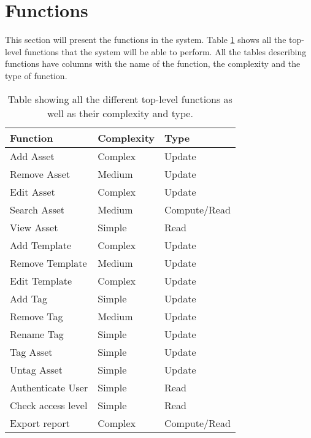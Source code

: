 \section{Functions}\label{sc:functions}

This section will present the functions in the system. Table \ref{tab:functions} shows all the top-level functions that the system will be able to perform. All the tables describing functions have columns with the name of the function, the complexity and the type of function.

\begin{table}[H]
\centering
    \begin{tabular}{|l|l|l|}
        \hline
        \textbf{Function} & \textbf{Complexity} & \textbf{Type} \\
        \hline
        \hline
        Add Asset & Complex & Update\\
        \hline
        Remove Asset & Medium & Update\\
        \hline
        Edit Asset & Complex & Update\\
        \hline
        Search Asset & Medium & Compute/Read\\
        \hline
        View Asset & Simple & Read\\
        \hline
        Add Template & Complex & Update\\
        \hline
        Remove Template & Medium & Update\\
        \hline
        Edit Template & Complex & Update\\
        \hline
        Add Tag & Simple & Update\\
        \hline
        Remove Tag & Medium & Update\\
        \hline
        Rename Tag & Simple & Update\\
        \hline
        Tag Asset & Simple & Update\\
        \hline
        Untag Asset & Simple & Update\\
        \hline
        Authenticate User & Simple & Read\\
        \hline
        Check access level & Simple & Read\\
        \hline
        Export report & Complex & Compute/Read\\
        \hline
    
    \end{tabular}
\caption{Table showing all the different top-level functions as well as their complexity and type.}\label{tab:functions}
\end{table}

